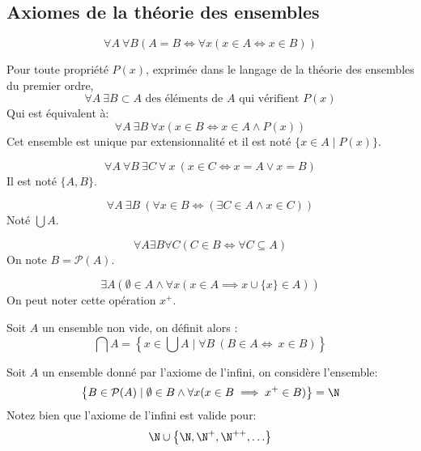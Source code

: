 \subsection{Axiomes de la théorie des ensembles}

\begin{axiom} [Extensionnalité]
	$$\forall A \ \forall B ( A = B \iff \forall x (x \in A \iff x \in B))$$
\end{axiom}

\begin{axiom} [Compréhension]
	Pour toute propriété $P(x)$, exprimée dans le langage de la théorie des ensembles du premier ordre,
	$$ \forall A \ \exists B \subset A \text{ des éléments de } A \text{ qui vérifient } P(x)$$
	Qui est équivalent à:
	$$ \forall A \  \exists B \  \forall x (x \in B \iff x \in A \land P(x))$$
	Cet ensemble est unique par extensionnalité et il est noté $\{x \in A \mid P(x)\}$.
\end{axiom}

\begin{axiom}
	$$ \forall A \  \forall B \  \exists C \  \forall \ x \  (x \in C \iff x = A \lor x = B)$$
	Il est noté $\{A,B\}$.
\end{axiom}

\begin{axiom}[Réunion]
	$$ \forall A \ \exists B \ (\forall x \in B \iff (\exists C \in A  \land x \in  C))$$
	Noté $\bigcup A$.
\end{axiom}


\begin{axiom}
	$$ \forall A \exists B \forall C ( C \in B \iff \forall C \subseteq A)$$
	On note $B = \mathcal{P}(A)$.
\end{axiom}


\begin{axiom}[Infini]
	$$ \exists A (\emptyset \in A \land \forall x (x \in A \implies x \cup \{x\} \in A))$$
	On peut noter cette opération $x^+$.
\end{axiom}


\begin{remarque}
	Soit $A$ un ensemble non vide, on définit alors :
	$$ \bigcap A = \left\{x \in \bigcup A \mid \forall B \ (B \in A \iff \ x \in B)\right\}$$
\end{remarque}


Soit $A$ un ensemble donné par l'axiome de l'infini, on considère l'ensemble:
$$ \left\{ B \in \mathcal{P}(A) \mid \emptyset \in B \land \forall x (x \in B \implies x^+ \in B) \right\} = \N $$
Notez bien que l'axiome de l'infini est valide pour:
$$ \N \cup \left\{ \N, \N^+, \N^{++}, \ldots \right\} $$


